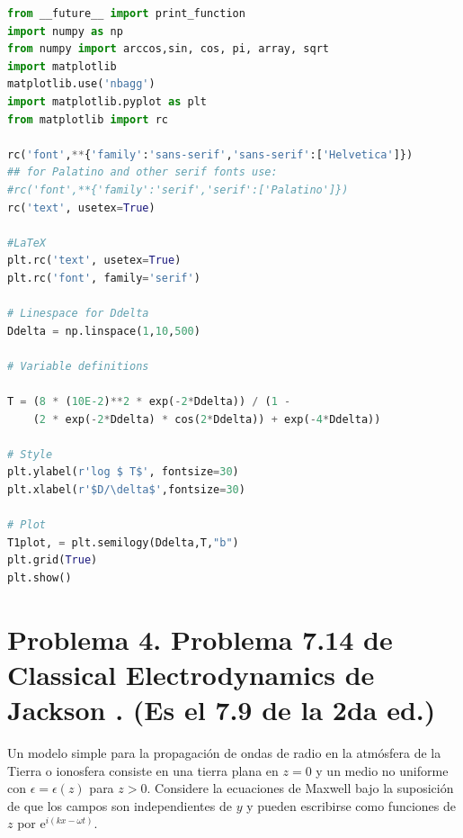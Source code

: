 \documentclass[a4paper,11pt]{article}
\numberwithin{equation}{section}
\newcommand{\euler}{\mathrm{e}}
\begin{document}
\begin{lstlisting}[language=Python]
from __future__ import print_function
import numpy as np
from numpy import arccos,sin, cos, pi, array, sqrt
import matplotlib
matplotlib.use('nbagg')
import matplotlib.pyplot as plt
from matplotlib import rc

rc('font',**{'family':'sans-serif','sans-serif':['Helvetica']})
## for Palatino and other serif fonts use:
#rc('font',**{'family':'serif','serif':['Palatino']})
rc('text', usetex=True)

#LaTeX
plt.rc('text', usetex=True)
plt.rc('font', family='serif')

# Linespace for Ddelta
Ddelta = np.linspace(1,10,500)

# Variable definitions

T = (8 * (10E-2)**2 * exp(-2*Ddelta)) / (1 - 
    (2 * exp(-2*Ddelta) * cos(2*Ddelta)) + exp(-4*Ddelta))

# Style
plt.ylabel(r'log $ T$', fontsize=30)
plt.xlabel(r'$D/\delta$',fontsize=30)

# Plot
T1plot, = plt.semilogy(Ddelta,T,"b")
plt.grid(True)
plt.show()

\end{lstlisting}

\newpage

\section{Problema 4. Problema 7.14 de Classical Electrodynamics
de Jackson \cite{jackson}. (Es el 7.9 de la 2da ed.)}

Un modelo simple para la propagación de ondas de radio en la atmósfera de la 
Tierra o ionosfera consiste en una tierra plana en $z = 0$ y un medio no 
uniforme con $\epsilon = \epsilon(z)$ para $z > 0$. Considere la ecuaciones 
de Maxwell bajo la suposición de que los campos son independientes de $y$ y 
pueden escribirse como funciones de $z$ por $\euler^{i(kx - \omega t)}$. 
\end{document}
